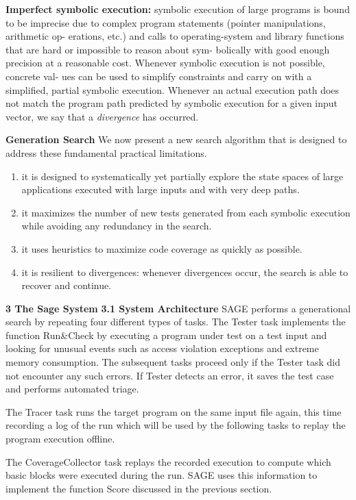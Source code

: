 \textbf{Imperfect symbolic execution:} symbolic execution of large programs is bound to be imprecise due to complex program statements (pointer manipulations, arithmetic op- erations, etc.) and calls to operating-system and library functions that are hard or impossible to reason about sym- bolically with good enough precision at a reasonable cost. Whenever symbolic execution is not possible, concrete val- ues can be used to simplify constraints and carry on with a simplified, partial symbolic execution.
Whenever an actual execution path does not match the program path predicted by symbolic execution for a given input vector, we say that a \textit{divergence} has occurred.

\textbf{Generation Search}
We now present a new search algorithm that is designed to address these fundamental practical limitations.
\begin{enumerate}
    \item it is designed to systematically yet partially explore the state spaces of large applications executed with large inputs and with very deep paths.
    \item it maximizes the number of new tests generated from each symbolic execution while avoiding any redundancy in the search.
    \item it uses heuristics to maximize code coverage as quickly as possible.
    \item it is resilient to divergences: whenever divergences occur, the search is able to recover and continue.
\end{enumerate}

\textbf{3 The Sage System} \textbf{3.1 System Architecture}
SAGE performs a generational search by repeating four different types of tasks. 
The Tester task implements the function Run\&Check by executing a program under test on a test input and looking for unusual events such as access violation exceptions and extreme memory consumption. 
The subsequent tasks proceed only if the Tester task did not encounter any such errors. 
If Tester detects an error, it saves the test case and performs automated triage.

The Tracer task runs the target program on the same input file again, this time recording a log of the run which will be used by the following tasks to replay the program execution offline.

The CoverageCollector task replays the recorded execution to compute which basic blocks were executed during the run. SAGE uses this information to implement the function Score discussed in the previous section.

